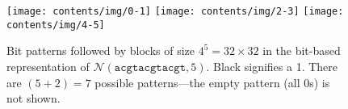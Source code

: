 \begin{figure}[h]
	\centering
	\label{fig:bit_patterns}
	\texttt{[image: contents/img/0-1]}\vspace*{5pt}
	\texttt{[image: contents/img/2-3]}\vspace*{5pt}
	\texttt{[image: contents/img/4-5]}
	\caption{Bit patterns followed by blocks of size $4^{5}=32\times32$ in the bit-based representation of $\mathcal{N}(\texttt{acgtacgtacgt},5)$. Black signifies a 1. There are $(5+2)=7$ possible patterns---the empty pattern (all 0s) is not shown.}
\end{figure}